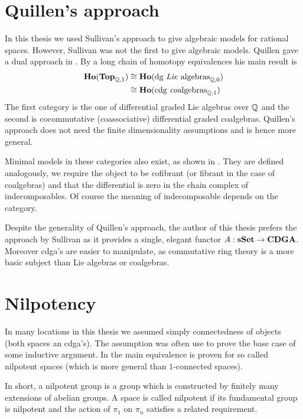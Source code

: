

\section{Quillen's approach}
In this thesis we used Sullivan's approach to give algebraic models for rational spaces. However, Sullivan was not the first to give algebraic models. Quillen gave a dual approach in \cite{quillen}. By a long chain of homotopy equivalences his main result is
\begin{align*}
	\mathbf{Ho}(\mathbf{Top}_{\mathbb{Q},1}) &\cong \mathbf{Ho}(\text{dg \emph{Lie} algebras}_{\mathbb{Q},0}) \\
		&\cong \mathbf{Ho}(\text{cdg \emph{co}algebras}_{\mathbb{Q},1})
\end{align*}
The first category is the one of differential graded Lie algebras over $\mathbb{Q}$ and the second is cocommutative (coassociative) differential graded coalgebras. Quillen's approach does not need the finite dimensionality assumptions and is hence more general.

Minimal models in these categories also exist, as shown in \cite{neisendorfer}. They are defined analogously, we require the object to be cofibrant (or fibrant in the case of coalgebras) and that the differential is zero in the chain complex of indecomposables. Of course the meaning of indecomposable depends on the category.

Despite the generality of Quillen's approach, the author of this thesis prefers the approach by Sullivan as it provides a single, elegant functor $A: \mathbf{s{\mathbf{Set}}} \to \mathbf{CDGA}$. Moreover cdga's are easier to manipulate, as commutative ring theory is a more basic subject than Lie algebras or coalgebras.


\section{Nilpotency}
In many locations in this thesis we assumed simply connectedness of objects (both spaces an cdga's). The assumption was often use to prove the base case of some inductive argument. In \cite{bousfield} the main equivalence is proven for so called nilpotent spaces (which is more general than $1$-connected spaces).

In short, a nilpotent group is a group which is constructed by finitely many extensions of abelian groups. A space is called nilpotent if its fundamental group is nilpotent and the action of $\pi_1$ on $\pi_n$ satisfies a related requirement.

